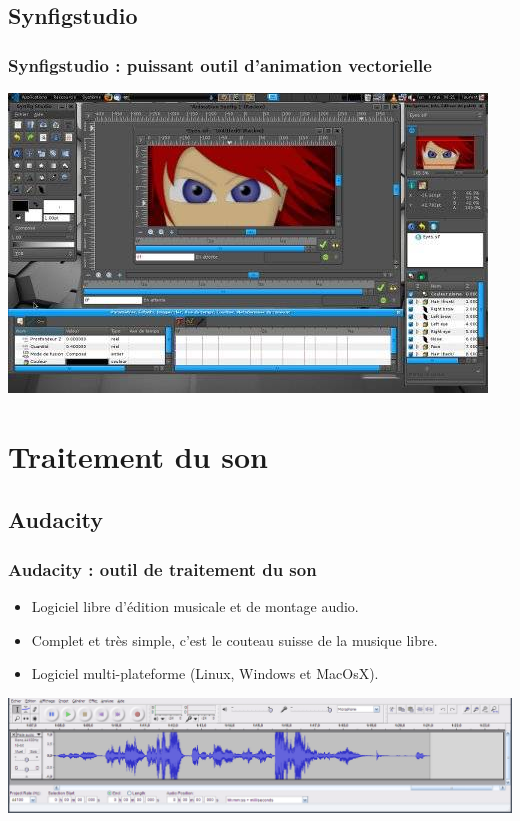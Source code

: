 \subsection{Synfigstudio}
\begin{frame}
\frametitle{Synfigstudio : puissant outil d'animation vectorielle}
\includegraphics[scale=0.50]{ressources/Synfigstudio.jpg}
\end{frame}

\section{Traitement du son}
\subsection{Audacity}
\begin{frame}
 \frametitle{Audacity : outil de traitement du son}
 \begin{itemize}
\item Logiciel libre d'édition musicale et de montage audio.
\item Complet et très simple, c'est le couteau suisse de la musique libre.
\item Logiciel multi-plateforme (Linux, Windows et MacOsX).
\end{itemize}
\includegraphics[scale=0.22]{ressources/audacity.png}
\end{frame}

